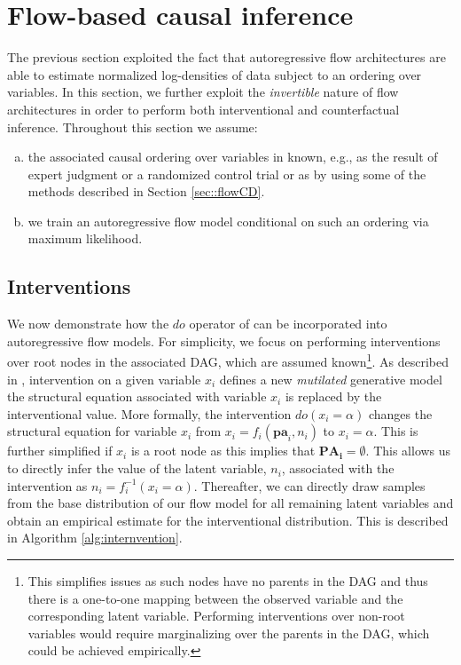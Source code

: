 \documentclass[]{article}
\begin{document}
\section{Flow-based causal inference}
\label{sec::flowCI}

The previous section exploited the fact that autoregressive flow architectures are able to estimate
normalized log-densities of data subject to an ordering over variables.  
In this section, we further exploit the \textit{invertible} nature of flow architectures in 
order to perform both interventional and counterfactual inference. 
%
Throughout this section we assume:
\begin{enumerate}[a)]
	\item the associated causal ordering over variables in known, e.g.,  as the
	result of expert judgment or a randomized control trial or as by using some of the methods 
	described in Section \ref{sec::flowCD}.
	\item we train an autoregressive flow model conditional on such an ordering via maximum likelihood.
\end{enumerate}

\subsection*{Interventions}

We now demonstrate how the $do$ operator of \cite{Pearl2009}
can be  incorporated into autoregressive flow models. 
For simplicity, we focus on performing interventions over root nodes in the associated 
DAG, which are assumed known\footnote{This simplifies issues as such nodes have no parents in the DAG and thus there is a one-to-one mapping between the observed variable and 
the corresponding latent variable. Performing interventions over non-root variables
would require marginalizing over the parents in the DAG, which could be achieved empirically.}. 
As described in \cite{Pearl2009}, %
intervention on a given variable $x_i$ defines a new 
\textit{mutilated} generative model
the structural equation associated with variable $x_i$ is replaced by the interventional value.
More formally, the intervention $do( x_i = \alpha)$ changes the structural equation for variable 
$x_i$ from $x_i = f_i( \mathbf{pa}_i, n_i)$ to $x_i = \alpha$. 
This is further simplified if $x_i$ is a root node as this implies that $\mathbf{PA_i} = \emptyset$. 
This allows us to directly infer the value of the
latent variable, $n_i$, associated with the intervention as
$n_i = f_i^{-1}( x_i = \alpha)$. Thereafter, we can directly draw samples from 
the base distribution of our flow model for all remaining latent variables and obtain an 
empirical estimate for the interventional distribution. This is described in Algorithm \ref{alg:internvention}. 
\end{document}
